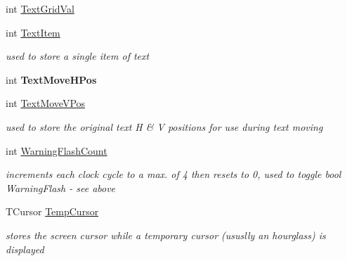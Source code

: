 \begin{DoxyCompactItemize}
int \mbox{\hyperlink{class_t_interface_a86dddbbcc24c740334718b1b80082c0d}{Text\+Grid\+Val}}
\item 
\mbox{\label{class_t_interface_a049c070bc8cf04330b359248b4d772d1}} 
int \mbox{\hyperlink{class_t_interface_a049c070bc8cf04330b359248b4d772d1}{Text\+Item}}
\begin{DoxyCompactList}\small\item\em used to store a single item of text \end{DoxyCompactList}\item 
\mbox{\label{class_t_interface_a17def25fca48e9790eea56715bd641f4}} 
int {\bfseries Text\+Move\+H\+Pos}
\item 
\mbox{\label{class_t_interface_a31983744b7c13161ed501a3288f8e985}} 
int \mbox{\hyperlink{class_t_interface_a31983744b7c13161ed501a3288f8e985}{Text\+Move\+V\+Pos}}
\begin{DoxyCompactList}\small\item\em used to store the original text \textquotesingle{}H\textquotesingle{} \& \textquotesingle{}V\textquotesingle{} positions for use during text moving \end{DoxyCompactList}\item 
\mbox{\label{class_t_interface_a6bee5767dfc53fea26f3e9abc0cd5d12}} 
int \mbox{\hyperlink{class_t_interface_a6bee5767dfc53fea26f3e9abc0cd5d12}{Warning\+Flash\+Count}}
\begin{DoxyCompactList}\small\item\em increments each clock cycle to a max. of 4 then resets to 0, used to toggle bool Warning\+Flash -\/ see above \end{DoxyCompactList}\item 
\mbox{\label{class_t_interface_ab1b67812d2bbd790158bc50e14172b35}} 
T\+Cursor \mbox{\hyperlink{class_t_interface_ab1b67812d2bbd790158bc50e14172b35}{Temp\+Cursor}}
\begin{DoxyCompactList}\small\item\em stores the screen cursor while a temporary cursor (ususlly an hourglass) is displayed \end{DoxyCompactList}\item 
\mbox{\label{class_t_interface_ad6dd127fe91cb3d461ad30cd1113e071}} 

\end{DoxyCompactItemize}
